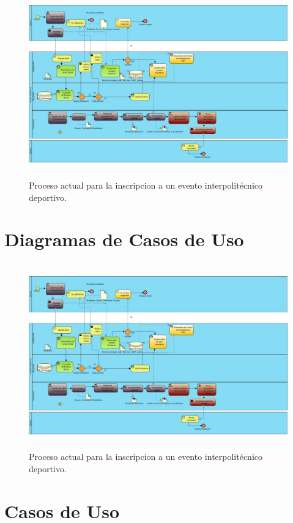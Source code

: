 		\begin{figure}[hbt!]
			\centering
			\includegraphics[width=16cm, height=8cm]{Imagenes/Disenos/ProcesoInscripcionPropuesto.jpg}
			\caption{Proceso actual para la inscripcion a un evento interpolitécnico deportivo.}
			\label{ProcesoInscripcionPropuesto}
		\end{figure}
	\pagebreak
	
	\section{Diagramas de Casos de Uso}
		\begin{figure}[hbt!]
			\centering
			\includegraphics[width=16cm, height=8cm]{Imagenes/Disenos/ProcesoInscripcionPropuesto.jpg}
			\caption{Proceso actual para la inscripcion a un evento interpolitécnico deportivo.}
			\label{Inscripcion}
		\end{figure}

	\section{Casos de Uso}
		
		
		
		
		
		
